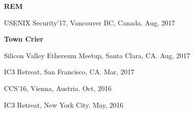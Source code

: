 \documentclass[11pt]{article}
\newcommand{\Subsection}[2]{\textbf{#1}\hfill{#2}}
\newcommand{\SubsectionOne}[1]{\Subsection{#1}{}}
\newenvironment{innerlist}[1][\enskip\textbullet]%
{\begin{compactitem}[#1]}{\end{compactitem}}
\begin{document}
\SubsectionOne{REM}
\begin{innerlist}
\item
USENIX Security'17, Vancouver BC, Canada. \hfill{Aug, 2017}
\end{innerlist}

\SubsectionOne{Town Crier}
\begin{innerlist}
\item
Silicon Valley Ethereum Meetup, Santa Clara, CA. \hfill{Aug, 2017}
\item
IC3 Retreat, San Francisco, CA. \hfill{Mar, 2017}
\item
CCS'16, Vienna, Austria. \hfill{Oct, 2016}
\item
IC3 Retreat, New York City. \hfill{May, 2016}
\end{innerlist}
\end{document}

